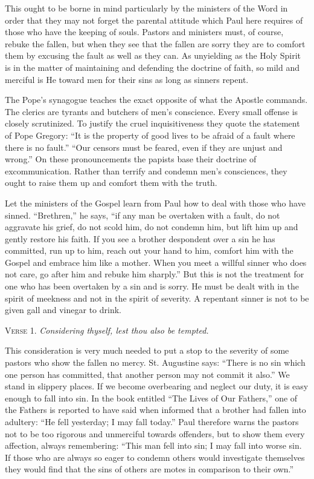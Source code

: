 This ought to be borne in mind particularly by the ministers of the Word in order that they may not forget the parental attitude which Paul here requires of those who have the keeping of souls. Pastors and ministers must, of course, rebuke the fallen, but when they see that the fallen are sorry they are to comfort them by excusing the fault as well as they can. As unyielding as the Holy Spirit is in the matter of maintaining and defending the doctrine of faith, so mild and merciful is He toward men for their sins as long as sinners repent.

The Pope’s synagogue teaches the exact opposite of what the Apostle commands. The clerics are tyrants and butchers of men’s conscience. Every small offense is closely scrutinized. To justify the cruel inquisitiveness they quote the statement of Pope Gregory: “It is the property of good lives to be afraid of a fault where there is no fault.” “Our censors must be feared, even if they are unjust and wrong.” On these pronouncements the papists base their doctrine of excommunication. Rather than terrify and condemn men’s consciences, they ought to raise them up and comfort them with the truth.

Let the ministers of the Gospel learn from Paul how to deal with those who have sinned. “Brethren,” he says, “if any man be overtaken with a fault, do not aggravate his grief, do not scold him, do not condemn him, but lift him up and gently restore his faith. If you see a brother despondent over a sin he has committed, run up to him, reach out your hand to him, comfort him with the Gospel and embrace him like a mother. When you meet a willful sinner who does not care, go after him and rebuke him sharply.” But this is not the treatment for one who has been overtaken by a sin and is sorry. He must be dealt with in the spirit of meekness and not in the spirit of severity. A repentant sinner is not to be given gall and vinegar to drink.

\textsc{Verse} 1. \emph{Considering thyself, lest thou also be tempted.}

This consideration is very much needed to put a stop to the severity of some pastors who show the fallen no mercy. St. Augustine says: “There is no sin which one person has committed, that another person may not commit it also.” We stand in slippery places. If we become overbearing and neglect our duty, it is easy enough to fall into sin. In the book entitled “The Lives of Our Fathers,” one of the Fathers is reported to have said when informed that a brother had fallen into adultery: “He fell yesterday; I may fall today.” Paul therefore warns the pastors not to be too rigorous and unmerciful towards offenders, but to show them every affection, always remembering: “This man fell into sin; I may fall into worse sin. If those who are always so eager to condemn others would investigate themselves they would find that the sins of others are motes in comparison to their own.”

